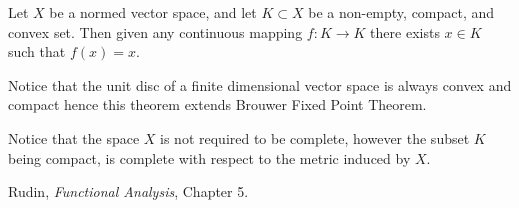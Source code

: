 \documentclass[12pt]{article}
\begin{document}
Let $X$ be a normed vector space, and let $K\subset X$ be a non-empty, compact, and convex set. 
Then given any continuous mapping $f\colon K \to K$
there exists $x\in K$ such that $f(x)=x$.

Notice that the unit disc of a finite dimensional vector space is always convex and compact hence this theorem extends Brouwer Fixed Point Theorem.

Notice that the space $X$ is not required to be complete, however the subset $K$ being compact, 
is complete with respect to the metric induced by $X$.

\begin{thebibliography}{9}
 Rudin, \emph{Functional Analysis}, Chapter 5.
\end{thebibliography}
\end{document}
